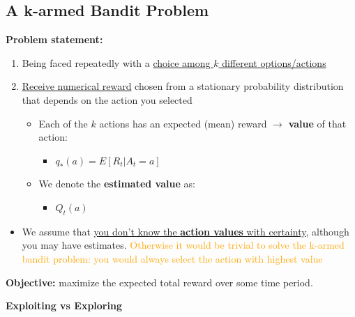 \documentclass[12pt, a4paper]{article}
\begin{document}
\subsection{A k-armed Bandit Problem }\label{k-armed-bandit-problem}

\textbf{Problem statement:}

\begin{enumerate}
\def\labelenumi{\arabic{enumi}.}
\item
  Being faced repeatedly with a \uline{choice among \(k\) different
  options/actions}
\item
  \uline{Receive numerical reward} chosen from a stationary probability
  distribution that depends on the action you selected

  \begin{itemize}
  \item
    Each of the \(k\) actions has an expected (mean) reward
    \(\rightarrow\) \textbf{value} of that action:

    \begin{itemize}
    \item
      \(q_*(a) = E[R_t | A_t = a]\)
    \end{itemize}
  \item
    We denote the \textbf{estimated value} as:

    \begin{itemize}
    \item
      \(Q_t(a)\)
    \end{itemize}
  \end{itemize}
\end{enumerate}


\begin{itemize}
\item
  We assume that \uline{you don't know the \textbf{action values} with
  certainty}, although you may have estimates. \textcolor{orange}{Otherwise it would be trivial to solve the k-armed bandit problem: you would always select the action with highest value}
\end{itemize}

\textbf{Objective:} maximize the expected total reward over some time
period.

\textbf{Exploiting vs Exploring}
\end{document}
